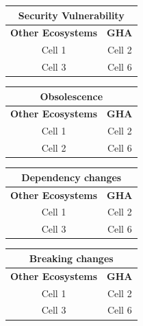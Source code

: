 \documentclass[conference]{IEEEtran}
\begin{document}
    \begin{minipage}{\linewidth}
      \begin{tabular}{|c|c|}
        \hline
        \multicolumn{2}{|c|}{\textbf{Security Vulnerability}} \\ \hline
        \textbf{Other Ecosystems} & \textbf{GHA} \\
        \hline
        \hline
        Cell 1 & Cell 2  \\
        \hline
        Cell 3 & Cell 6 \\
        \hline
      \end{tabular}
      \end{minipage}
      
      \begin{minipage}{\linewidth}
      \begin{tabular}{|c|c|}
        \hline
        \multicolumn{2}{|c|}{\textbf{Obsolescence}} \\ \hline
        \textbf{Other Ecosystems} & \textbf{GHA} \\
        \hline
        \hline
        Cell 1 & Cell 2  \\
        \hline
        Cell 2 & Cell 6 \\
        \hline
      \end{tabular}
      \end{minipage}
      
      \begin{minipage}{\linewidth}
      \begin{tabular}{|c|c|}
        \hline
        \multicolumn{2}{|c|}{\textbf{Dependency changes}} \\ \hline
        \textbf{Other Ecosystems} & \textbf{GHA} \\
        \hline
        \hline
        Cell 1 & Cell 2  \\
        \hline
        Cell 3 & Cell 6 \\
        \hline
      \end{tabular}
      \end{minipage}
      
      \begin{minipage}{\linewidth}
      \begin{tabular}{|c|c|}
        \hline
        \multicolumn{2}{|c|}{\textbf{Breaking changes}} \\ \hline
        \textbf{Other Ecosystems} & \textbf{GHA} \\
        \hline
        \hline
        Cell 1 & Cell 2  \\
        \hline
        Cell 3 & Cell 6 \\
        \hline
      \end{tabular}
      \end{minipage}
\end{document}
